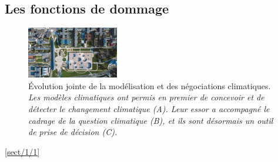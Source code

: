 \subsection{Les fonctions de dommage}
\label{sect:1.3.3}

\begin{figure}
    \centering
    \includegraphics[width=4cm]{figures/campus.jpg}
    \caption{Évolution jointe de la modélisation et des négociations climatiques. \textit{Les modèles climatiques ont permis en premier de concevoir et de détecter le changement climatique (A). Leur essor a accompagné le cadrage de la question climatique (B), et ils sont désormais un outil de prise de décision (C).}}
    \label{fig:frise}
\end{figure}

\ref{sect/1/1}


